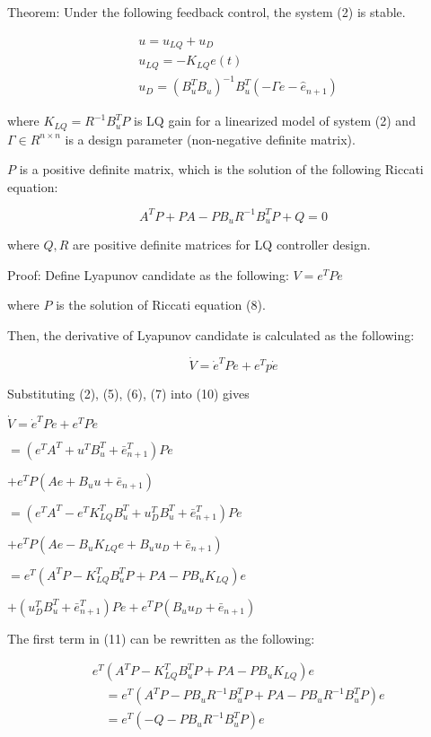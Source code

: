 \documentclass[10pt]{article}
\begin{document}
Theorem: Under the following feedback control, the system (2) is stable.

$$
\begin{aligned}
& u=u_{L Q}+u_{D} \\
& u_{L Q}=-K_{L Q} e(t) \\
& u_{D}=\left(B_{u}^{T} B_{u}\right)^{-1} B_{u}^{T}\left(-\Gamma e-\hat{e}_{n+1}\right)
\end{aligned}
$$

where $K_{L Q}=R^{-1} B_{u}^{T} P$ is LQ gain for a linearized model of system (2) and $\Gamma \in R^{n \times n}$ is a design parameter (non-negative definite matrix).

$P$ is a positive definite matrix, which is the solution of the following Riccati equation:

$$
A^{T} P+P A-P B_{u} R^{-1} B_{u}^{T} P+Q=0
$$

where $Q, R$ are positive definite matrices for LQ controller design.

Proof: Define Lyapunov candidate as the following: $V=e^{T} P e$

where $P$ is the solution of Riccati equation (8).

Then, the derivative of Lyapunov candidate is calculated as the following:

$$
\dot{V}=\dot{e}^{T} P e+e^{T} p \dot{e}
$$

Substituting (2), (5), (6), (7) into (10) gives

$\dot{V}=\dot{e}^{T} P e+e^{T} P \dot{e}$

$=\left(e^{T} A^{T}+u^{T} B_{u}^{T}+\bar{e}_{n+1}^{T}\right) P e$

$+e^{T} P\left(A e+B_{u} u+\bar{e}_{n+1}\right)$

$=\left(e^{T} A^{T}-e^{T} K_{L Q}^{T} B_{u}^{T}+u_{D}^{T} B_{u}^{T}+\bar{e}_{n+1}^{T}\right) P e$

$+e^{T} P\left(A e-B_{u} K_{L Q} e+B_{u} u_{D}+\bar{e}_{n+1}\right)$

$=e^{T}\left(A^{T} P-K_{L Q}^{T} B_{u}^{T} P+P A-P B_{u} K_{L Q}\right) e$

$+\left(u_{D}^{T} B_{u}^{T}+\bar{e}_{n+1}^{T}\right) P e+e^{T} P\left(B_{u} u_{D}+\bar{e}_{n+1}\right)$

The first term in (11) can be rewritten as the following:

$$
\begin{aligned}
& e^{T}\left(A^{T} P-K_{L Q}^{T} B_{u}^{T} P+P A-P B_{u} K_{L Q}\right) e \\
& \quad=e^{T}\left(A^{T} P-P B_{u} R^{-1} B_{u}^{T} P+P A-P B_{u} R^{-1} B_{u}^{T} P\right) e \\
& \quad=e^{T}\left(-Q-P B_{u} R^{-1} B_{u}^{T} P\right) e
\end{aligned}
$$
\end{document}
